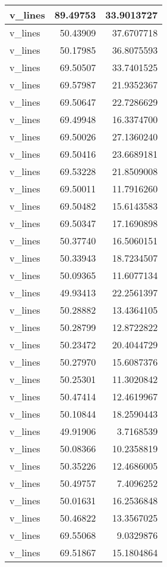 \documentclass[
]{book}
\theoremstyle{definition}
\theoremstyle{definition}
\theoremstyle{definition}
\theoremstyle{definition}
\theoremstyle{remark}
\begin{document}
\begin{tabular}{l|r|r}
\hline
v\_lines & 89.49753 & 33.9013727\\
\hline
v\_lines & 50.43909 & 37.6707718\\
\hline
v\_lines & 50.17985 & 36.8075593\\
\hline
v\_lines & 69.50507 & 33.7401525\\
\hline
v\_lines & 69.57987 & 21.9352367\\
\hline
v\_lines & 69.50647 & 22.7286629\\
\hline
v\_lines & 69.49948 & 16.3374700\\
\hline
v\_lines & 69.50026 & 27.1360240\\
\hline
v\_lines & 69.50416 & 23.6689181\\
\hline
v\_lines & 69.53228 & 21.8509008\\
\hline
v\_lines & 69.50011 & 11.7916260\\
\hline
v\_lines & 69.50482 & 15.6143583\\
\hline
v\_lines & 69.50347 & 17.1690898\\
\hline
v\_lines & 50.37740 & 16.5060151\\
\hline
v\_lines & 50.33943 & 18.7234507\\
\hline
v\_lines & 50.09365 & 11.6077134\\
\hline
v\_lines & 49.93413 & 22.2561397\\
\hline
v\_lines & 50.28882 & 13.4364105\\
\hline
v\_lines & 50.28799 & 12.8722822\\
\hline
v\_lines & 50.23472 & 20.4044729\\
\hline
v\_lines & 50.27970 & 15.6087376\\
\hline
v\_lines & 50.25301 & 11.3020842\\
\hline
v\_lines & 50.47414 & 12.4619967\\
\hline
v\_lines & 50.10844 & 18.2590443\\
\hline
v\_lines & 49.91906 & 3.7168539\\
\hline
v\_lines & 50.08366 & 10.2358819\\
\hline
v\_lines & 50.35226 & 12.4686005\\
\hline
v\_lines & 50.49757 & 7.4096252\\
\hline
v\_lines & 50.01631 & 16.2536848\\
\hline
v\_lines & 50.46822 & 13.3567025\\
\hline
v\_lines & 69.55068 & 9.0329876\\
\hline
v\_lines & 69.51867 & 15.1804864\\

\end{tabular}
\end{document}
